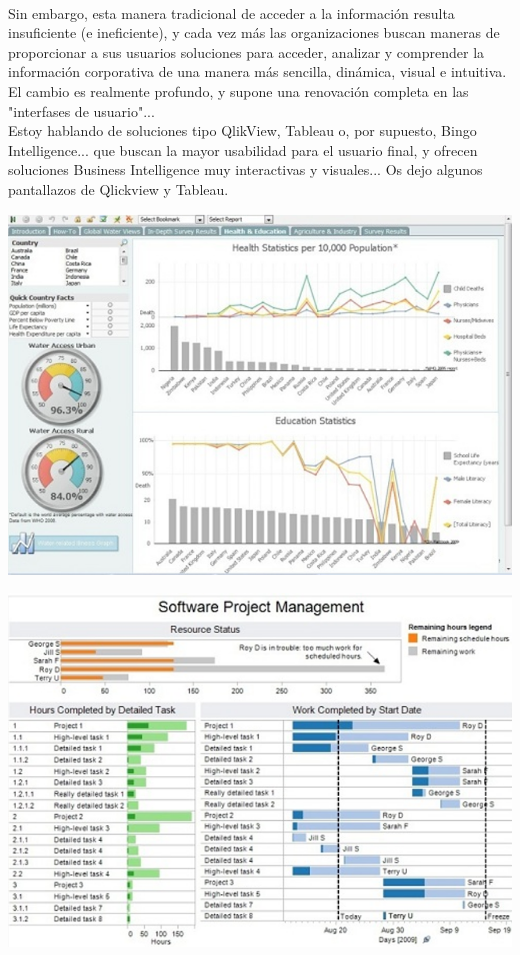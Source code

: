 \begin{enumerate}[1.]
\\
Sin embargo, esta manera tradicional de acceder a la informaci\'on resulta insuficiente (e ineficiente), y cada vez m\'as las organizaciones buscan maneras de proporcionar a sus usuarios soluciones para acceder, analizar y comprender la informaci\'on corporativa de una manera m\'as sencilla, din\'amica, visual e intuitiva. El cambio es realmente profundo, y supone una renovaci\'on completa en las "interfases de usuario"...
\\
Estoy hablando de soluciones tipo QlikView, Tableau o, por supuesto, Bingo Intelligence... que buscan la mayor usabilidad para el usuario final, y ofrecen soluciones Business Intelligence muy interactivas y visuales... Os dejo algunos pantallazos de Qlickview y Tableau.

\end{enumerate}

\begin{center}
\includegraphics[scale=0.60]{./Imagenes/img1.png}
\end{center}

\begin{center}
\includegraphics[scale=0.60]{./Imagenes/img2.png}
\end{center}

